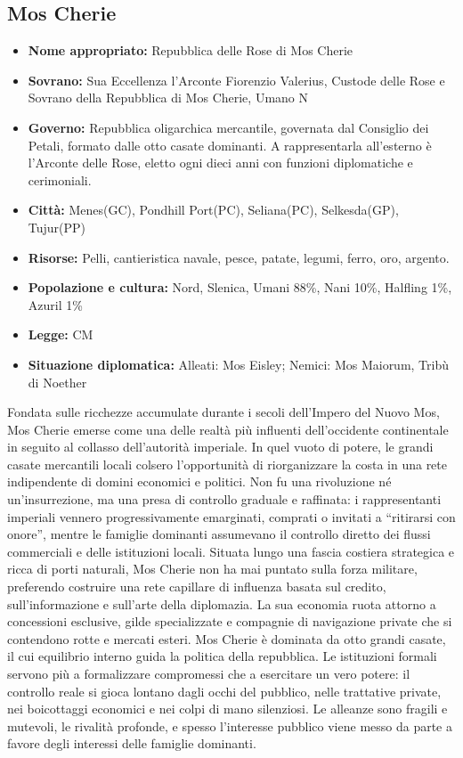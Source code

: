 \documentclass[10pt, a4paper]{report}
\begin{document}
\begin{multicols}{2}
\subsection*{Mos Cherie}
\begin{itemize}
	\item \textbf{Nome appropriato:} Repubblica delle Rose di Mos Cherie
	\item \textbf{Sovrano:} Sua Eccellenza l’Arconte Fiorenzio Valerius, Custode delle Rose e Sovrano della Repubblica di Mos Cherie, Umano N
	\item \textbf{Governo:} Repubblica oligarchica mercantile, governata dal Consiglio dei Petali, formato dalle otto casate dominanti. A rappresentarla all’esterno è l’Arconte delle Rose, eletto ogni dieci anni con funzioni diplomatiche e cerimoniali.
	\item \textbf{Città:} Menes(GC), Pondhill Port(PC), Seliana(PC), Selkesda(GP), Tujur(PP)
	\item \textbf{Risorse:} Pelli, cantieristica navale, pesce, patate, legumi, ferro, oro, argento.
	\item \textbf{Popolazione e cultura:} Nord, Slenica, Umani 88\%, Nani 10\%, Halfling 1\%, Azuril 1\%
	\item \textbf{Legge:} CM
	\item \textbf{Situazione diplomatica:} Alleati: Mos Eisley; Nemici: Mos Maiorum, Tribù di Noether
\end{itemize}
Fondata sulle ricchezze accumulate durante i secoli dell’Impero del Nuovo Mos, Mos Cherie emerse come una delle realtà più influenti dell’occidente continentale in seguito al collasso dell’autorità imperiale. In quel vuoto di potere, le grandi casate mercantili locali colsero l’opportunità di riorganizzare la costa in una rete indipendente di domini economici e politici. Non fu una rivoluzione né un’insurrezione, ma una presa di controllo graduale e raffinata: i rappresentanti imperiali vennero progressivamente emarginati, comprati o invitati a “ritirarsi con onore”, mentre le famiglie dominanti assumevano il controllo diretto dei flussi commerciali e delle istituzioni locali.
Situata lungo una fascia costiera strategica e ricca di porti naturali, Mos Cherie non ha mai puntato sulla forza militare, preferendo costruire una rete capillare di influenza basata sul credito, sull’informazione e sull’arte della diplomazia. La sua economia ruota attorno a concessioni esclusive, gilde specializzate e compagnie di navigazione private che si contendono rotte e mercati esteri. 
Mos Cherie è dominata da otto grandi casate, il cui equilibrio interno guida la politica della repubblica. Le istituzioni formali servono più a formalizzare compromessi che a esercitare un vero potere: il controllo reale si gioca lontano dagli occhi del pubblico, nelle trattative private, nei boicottaggi economici e nei colpi di mano silenziosi. Le alleanze sono fragili e mutevoli, le rivalità profonde, e spesso l’interesse pubblico viene messo da parte a favore degli interessi delle famiglie dominanti.

\end{multicols}
\end{document}
